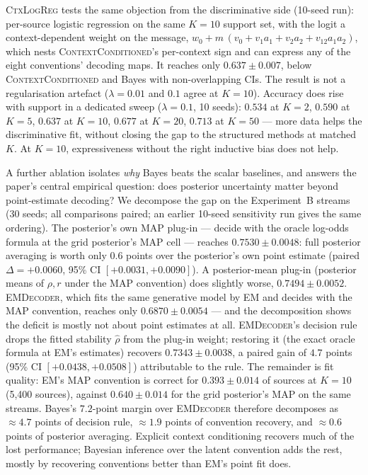 {\textsc{CtxLogReg} tests the same objection from the discriminative side
(10-seed run): per-source
logistic regression on the same $K=10$ support set, with the logit a
context-dependent weight on the message,
$w_0 + m\,(v_0 + v_1a_1 + v_2a_2 + v_{12}a_1a_2)$, which nests
\textsc{ContextConditioned}'s per-context sign and can express any of the
eight conventions' decoding maps. It reaches only $0.637 \pm 0.007$,
below \textsc{ContextConditioned} and Bayes with non-overlapping CIs.
The result is not a regularisation artefact ($\lambda = 0.01$ and $0.1$
agree at $K=10$). Accuracy does rise with support in a dedicated sweep
($\lambda = 0.1$, 10 seeds): $0.534$ at $K=2$, $0.590$ at $K=5$,
$0.637$ at $K=10$, $0.677$ at $K=20$, $0.713$ at $K=50$ --- more data
helps the discriminative fit, without closing the gap to the structured
methods at matched $K$. At
$K=10$, expressiveness without the right inductive bias does not help.

A further ablation isolates \emph{why} Bayes beats the scalar baselines,
and answers the paper's central empirical question: does posterior
uncertainty matter beyond point-estimate decoding? We decompose the gap
on the Experiment~B streams (30 seeds; all comparisons paired; an
earlier 10-seed sensitivity run gives the same ordering). The
posterior's own MAP plug-in --- decide with the oracle log-odds formula
at the grid posterior's MAP cell --- reaches $0.7530 \pm 0.0048$: full
posterior averaging is worth only $0.6$ points over the posterior's own
point estimate (paired $\Delta = +0.0060$, 95\% CI $[+0.0031, +0.0090]$).
A posterior-mean plug-in (posterior means of $\rho, r$ under the MAP
convention) does slightly worse, $0.7494 \pm 0.0052$.
\textsc{EMDecoder}, which fits the same generative model by EM and
decides with the MAP convention, reaches only $0.6870 \pm 0.0054$ ---
and the decomposition shows the deficit is mostly not about point
estimates at all. \textsc{EMDecoder}'s decision rule drops the fitted
stability $\hat\rho$ from the plug-in weight; restoring it (the exact
oracle formula at EM's estimates) recovers $0.7343 \pm 0.0038$, a paired
gain of $4.7$ points (95\% CI $[+0.0438, +0.0508]$) attributable to the
rule. The remainder is fit quality: EM's MAP convention is correct for
$0.393 \pm 0.014$ of sources at $K=10$ (5,400 sources), against
$0.640 \pm 0.014$ for the grid posterior's MAP on the same streams.
Bayes's $7.2$-point margin over \textsc{EMDecoder} therefore decomposes
as $\approx 4.7$ points of decision rule, $\approx 1.9$ points of
convention recovery, and $\approx 0.6$ points of posterior averaging.
Explicit context conditioning recovers much of the lost performance;
Bayesian inference over the latent convention adds the rest, mostly by
recovering conventions better than EM's point fit does.
\par}

